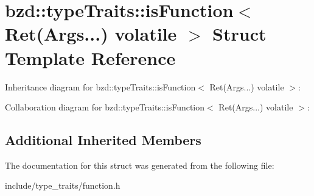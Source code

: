 \hypertarget{structbzd_1_1typeTraits_1_1isFunction_3_01Ret_07Args_8_8_8_08_01volatile_01_4}{}\section{bzd\+:\+:type\+Traits\+:\+:is\+Function$<$ Ret(Args...) volatile $>$ Struct Template Reference}
\label{structbzd_1_1typeTraits_1_1isFunction_3_01Ret_07Args_8_8_8_08_01volatile_01_4}


Inheritance diagram for bzd\+:\+:type\+Traits\+:\+:is\+Function$<$ Ret(Args...) volatile $>$\+:


Collaboration diagram for bzd\+:\+:type\+Traits\+:\+:is\+Function$<$ Ret(Args...) volatile $>$\+:
\subsection*{Additional Inherited Members}


The documentation for this struct was generated from the following file\+:\begin{DoxyCompactItemize}
\item 
include/type\+\_\+traits/function.\+h\end{DoxyCompactItemize}
